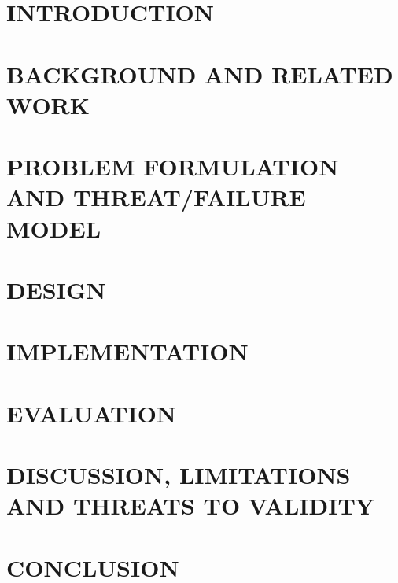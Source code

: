 \documentclass[journal]{IEEEtran}
\begin{document}
\accmaketitle

\section{INTRODUCTION}\label{sec:intro}

\section{BACKGROUND AND RELATED WORK}\label{sec:related}

\section{PROBLEM FORMULATION AND THREAT/FAILURE MODEL}\label{sec:problem}

\section{DESIGN}\label{sec:design}

\section{IMPLEMENTATION}\label{sec:impl}

\section{EVALUATION}\label{sec:eval}

\section{DISCUSSION, LIMITATIONS AND THREATS TO VALIDITY}\label{sec:limits}

\section{CONCLUSION}\label{sec:conclusion}





\end{document}
